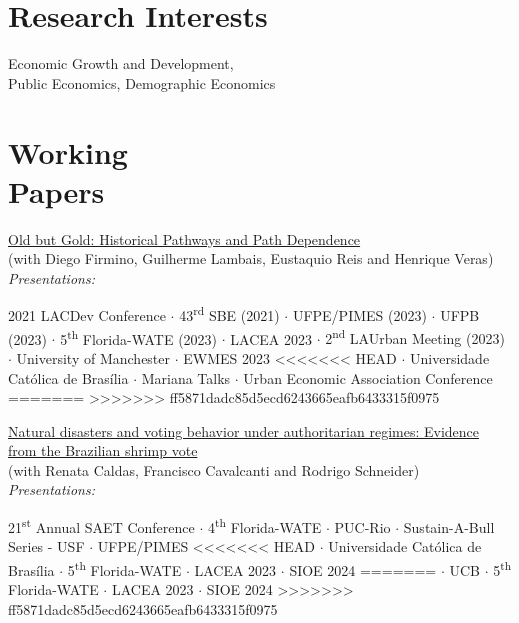 \documentclass[mm, 10pt]{simple_style}
\begin{document}
\begin{resume}
\section{Research Interests}

Economic Growth and Development,   \\
Public Economics, Demographic Economics


\section{Working \\ Papers \\ {\protect\footnotesize {}}}

\href{https://papers.ssrn.com/sol3/papers.cfm?abstract_id=4513384}{Old but Gold: Historical Pathways and Path Dependence} \\
(with Diego Firmino, Guilherme Lambais, Eustaquio Reis and Henrique Veras) \\
\textit{Presentations:} 
\begin{minipage}[t]{0.7\textwidth}
2021 LACDev Conference
$\cdot$ 43\textsuperscript{rd} SBE (2021)
$\cdot$ UFPE/PIMES (2023)
$\cdot$ UFPB (2023)
$\cdot$ 5\textsuperscript{th} Florida-WATE (2023)
$\cdot$ {LACEA 2023}
$\cdot$ {2\textsuperscript{nd} LAUrban Meeting (2023)}
$\cdot$ University of Manchester
$\cdot$ {EWMES 2023}
<<<<<<< HEAD
$\cdot$ Universidade Cat\'olica de Bras\'ilia 
$\cdot$ Mariana Talks 
$\cdot$ {\color{gray} Urban Economic Association Conference}
=======
>>>>>>> ff5871dadc85d5ecd6243665eafb6433315f0975
\end{minipage}

\href{https://papers.ssrn.com/sol3/papers.cfm?abstract_id=4249006}{Natural disasters and voting behavior under authoritarian regimes: Evidence from the Brazilian shrimp vote} \\
(with Renata Caldas, Francisco Cavalcanti and Rodrigo Schneider) \\
\textit{Presentations:} 
\begin{minipage}[t]{0.7\textwidth}
 21\textsuperscript{st} Annual SAET Conference 
 $\cdot$ 4\textsuperscript{th} Florida-WATE 
 $\cdot$ PUC-Rio 
 $\cdot$ Sustain-A-Bull Series - USF 
 $\cdot$ UFPE/PIMES 
<<<<<<< HEAD
$\cdot$ Universidade Cat\'olica de Bras\'ilia 
 $\cdot$ 5\textsuperscript{th} Florida-WATE
 $\cdot$ {LACEA 2023} 
 $\cdot$ {SIOE 2024}
=======
 $\cdot$ UCB 
 $\cdot$ 5\textsuperscript{th} Florida-WATE
 $\cdot$ {LACEA 2023} 
 $\cdot$ {\color{gray} SIOE 2024}
>>>>>>> ff5871dadc85d5ecd6243665eafb6433315f0975
\end{minipage}


\end{resume}
\end{document}
